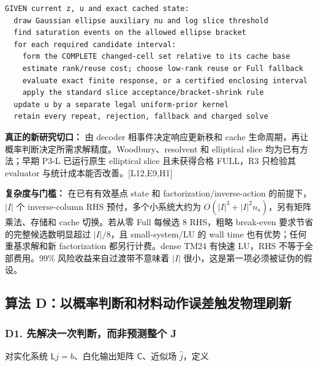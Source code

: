 \documentclass[
  11pt,
  a4paper,
]{article}
\begin{document}
\begin{verbatim}
GIVEN current z, u and exact cached state:
  draw Gaussian ellipse auxiliary nu and log slice threshold
  find saturation events on the allowed ellipse bracket
  for each required candidate interval:
    form the COMPLETE changed-cell set relative to its cache base
    estimate rank/reuse cost; choose low-rank reuse or Full fallback
    evaluate exact finite response, or a certified enclosing interval
    apply the standard slice acceptance/bracket-shrink rule
  update u by a separate legal uniform-prior kernel
  retain every repeat, rejection, fallback and charged solve
\end{verbatim}

\textbf{真正的新研究切口：} 由 decoder 相事件决定响应更新秩和 cache
生命周期，再让概率判断决定所需求解精度。Woodbury、resolvent 和
elliptical slice 均为已有方法；早期 P3-L 已运行原生 elliptical slice
且未获得合格 FULL，R3 只检验其 evaluator
与统计成本能否改善。{[}L12,E9,H1{]}

\textbf{复杂度与门槛：} 在已有有效基点 state 和
factorization/inverse-action 的前提下，\(|I|\) 个 inverse-column RHS
预付，多个小系统大约为 \(O(|I|^3+|I|^2n_s)\)，另有矩阵乘法、存储和 cache
切换。若从零 Full 每候选 8 RHS，粗略 break-even
要求节省的完整候选数明显超过 \(|I|/8\)，且 small-system/LU 的 wall time
也有优势；任何重基求解和新 factorization 都另行计费。dense TM24 有快速
LU，RHS 不等于全部费用。99\% 风险收益来自过渡带不意味着 \(|I|\)
很小，这是第一项必须被证伪的假设。

\hypertarget{ux7b97ux6cd5-dux4ee5ux6982ux7387ux5224ux65adux548cux6750ux6599ux52a8ux4f5cux8befux5deeux89e6ux53d1ux7269ux7406ux5237ux65b0}{%
\subsection{算法
D：以概率判断和材料动作误差触发物理刷新}\label{ux7b97ux6cd5-dux4ee5ux6982ux7387ux5224ux65adux548cux6750ux6599ux52a8ux4f5cux8befux5deeux89e6ux53d1ux7269ux7406ux5237ux65b0}}

\hypertarget{d1.-ux5148ux89e3ux51b3ux4e00ux6b21ux5224ux65adux800cux975eux9884ux6d4bux6574ux4e2a-j}{%
\subsubsection{D1. 先解决一次判断，而非预测整个
J}\label{d1.-ux5148ux89e3ux51b3ux4e00ux6b21ux5224ux65adux800cux975eux9884ux6d4bux6574ux4e2a-j}}

对实化系统 \(\mathsf L j=b\)、白化输出矩阵 \(\mathsf C\)、近似场
\(\widehat j\)，定义
\end{document}
